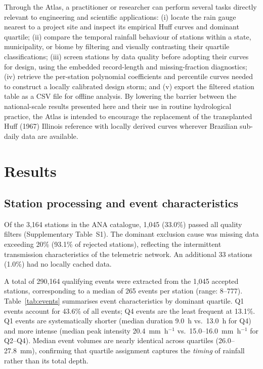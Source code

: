 \documentclass[a4paper,fleqn]{cas-sc}
\begin{document}
Through the Atlas, a practitioner or researcher can perform several
tasks directly relevant to engineering and scientific applications:
(i) locate the rain gauge nearest to a project site and inspect its
empirical Huff curves and dominant quartile; (ii) compare the temporal
rainfall behaviour of stations within a state, municipality, or biome
by filtering and visually contrasting their quartile classifications;
(iii) screen stations by data quality before adopting their curves for
design, using the embedded record-length and missing-fraction
diagnostics; (iv) retrieve the per-station polynomial coefficients and
percentile curves needed to construct a locally calibrated design
storm; and (v) export the filtered station table as a CSV file for
offline analysis. By lowering the barrier between the national-scale
results presented here and their use in routine hydrological practice,
the Atlas is intended to encourage the replacement of the
transplanted Huff (1967) Illinois reference with locally derived
curves wherever Brazilian sub-daily data are available.


\section{Results}
\label{sec:results}

\subsection{Station processing and event characteristics}

Of the 3,164 stations in the ANA catalogue, 1,045 (33.0\%) passed
all quality filters (Supplementary Table~S1). The dominant
exclusion cause was missing data exceeding 20\% (93.1\% of rejected
stations), reflecting the intermittent transmission characteristics
of the telemetric network. An additional 33 stations (1.0\%) had no
locally cached data.

A total of 290,164 qualifying events were extracted from the 1,045
accepted stations, corresponding to a median of 265 events per
station (range: 8–777). Table~\ref{tab:events} summarises event
characteristics by dominant quartile. Q1 events account for 43.6\%
of all events; Q4 events are the least frequent at 13.1\%. Q1 events
are systematically shorter (median duration 9.0~h vs.\ 13.0~h for
Q4) and more intense (median peak intensity 20.4~mm~h$^{-1}$ vs.\
15.0–16.0~mm~h$^{-1}$ for Q2–Q4). Median event volumes are nearly
identical across quartiles (26.0–27.8~mm), confirming that quartile
assignment captures the \emph{timing} of rainfall rather than its
total depth.
\end{document}
